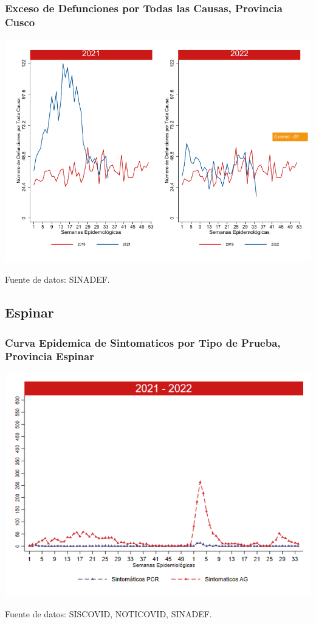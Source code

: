 \documentclass[xcolor=table]{beamer}
\begin{document}
\begin{frame}
	\frametitle{Exceso de Defunciones por Todas las Causas, Provincia Cusco}
	\vspace{-.5cm}
	\begin{center}
		\includegraphics[width=0.8\linewidth, trim={0cm .5cm 0cm 0.2cm},clip]{../figuras/exceso_7.pdf}
	\end{center}
	{\tiny Fuente de datos: SINADEF.}
	
	\hyperlink{indicadores_provinciales}{}
\end{frame}

\subsection{Espinar}
\begin{frame}[label=Espinar]
	\frametitle{Curva Epidemica de Sintomaticos por Tipo de Prueba, Provincia Espinar}
	\vspace{-.5cm}
	\begin{center}
		\includegraphics[width=0.8\linewidth, trim={0cm .5cm 0cm 0.2cm},clip]{../figuras/sinto_prueba20_21_8.png}
	\end{center}
	{\tiny Fuente de datos: SISCOVID, NOTICOVID, SINADEF.}
	\hyperlink{TipoPrueba}{}
\end{frame}
\end{document}
